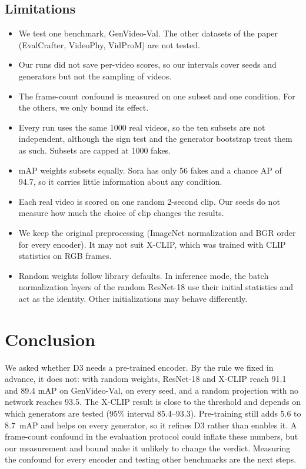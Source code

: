 \documentclass[conference]{IEEEtran}
\begin{document}
\subsection{Limitations}

\begin{itemize}
  \item We test one benchmark, GenVideo-Val. The other datasets of the
        paper (EvalCrafter, VideoPhy, VidProM) are not tested.
  \item Our runs did not save per-video scores, so our intervals cover seeds
        and generators but not the sampling of videos.
  \item The frame-count confound is measured on one subset and one condition.
        For the others, we only bound its effect.
  \item Every run uses the same 1000 real videos, so the ten subsets are not
        independent, although the sign test and the generator bootstrap
        treat them as such. Subsets are capped at 1000 fakes.
  \item mAP weights subsets equally. Sora has only 56 fakes and a chance AP of
        94.7, so it carries little information about any condition.
  \item Each real video is scored on one random 2-second clip. Our seeds do
        not measure how much the choice of clip changes the results.
  \item We keep the original preprocessing (ImageNet normalization and BGR
        order for every encoder). It may not suit X-CLIP, which was trained
        with CLIP statistics on RGB frames.
  \item Random weights follow library defaults. In inference mode, the batch
        normalization layers of the random ResNet-18 use their initial
        statistics and act as the identity. Other initializations may behave
        differently.
\end{itemize}

\section{Conclusion}
\label{sec:conclusion}

We asked whether D3 needs a pre-trained encoder. By the rule we fixed in
advance, it does not: with random weights, ResNet-18 and X-CLIP reach 91.1
and 89.4 mAP on GenVideo-Val, on every seed, and a random projection with no
network reaches 93.5. The X-CLIP result is close to the threshold and depends
on which generators are tested (95\% interval 85.4--93.3). Pre-training still adds 5.6 to 8.7~mAP and helps on
every generator, so it refines D3 rather than enables it. A frame-count
confound in the evaluation protocol could inflate these numbers, but our
measurement and bound make it unlikely to change the verdict. Measuring the
confound for every encoder and testing other benchmarks are the next steps.
\end{document}
